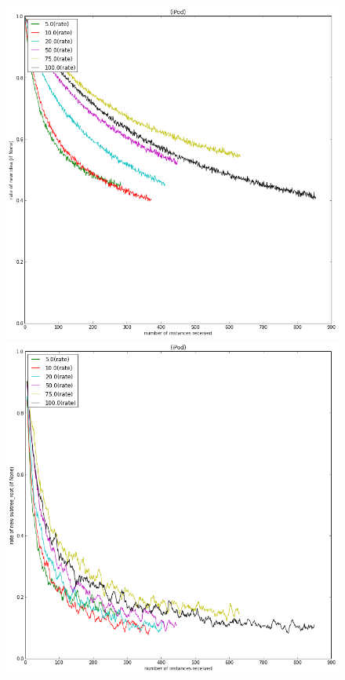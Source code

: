 \begin{figure}
    \centering
    \includegraphics[width=0.9\columnwidth]{rate_new_idea_over_time}
    \includegraphics[width=0.9\columnwidth]{rate_new_category_over_time}

\end{figure}
